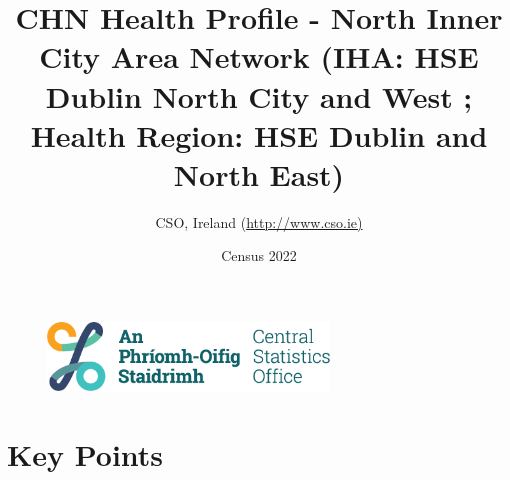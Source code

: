 \documentclass{article}
\title{CHN Health Profile - North Inner City Area Network (IHA: HSE Dublin North City and West ;  Health Region: HSE Dublin and North East) }
\date{Census 2022}
\author{CSO, Ireland  (\url{http://www.cso.ie)}}
\begin{document}


\begin{figure}
	\centering
\includegraphics[width =75mm]{../figures/CSO_Logo.png}
\end{figure}

				 
		   
						  
														  
																																													
												 
			 
\maketitle
					
													   
				 
						 
																																																																											   
				 
				  
  \pagebreak
    	    \tableofcontents

\pagebreak


\section{Key Points}
\end{document}
